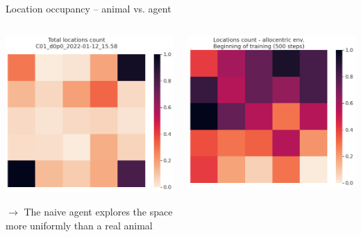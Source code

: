 \documentclass[bigger]{beamer}
\begin{document}
\begin{frame}[label={sec:org25af807}]{Location occupancy -- animal vs. agent}
\begin{columns}
\begin{column}{0.5\columnwidth}
\begin{center}
\includegraphics[height=0.43\textheight]{img/C01_d0p0_2022-01-12_15.58_locations_count.png}
\end{center}
\(\to\) The naive agent explores the space more uniformly than a real animal
\end{column}
\begin{column}{0.5\columnwidth}
\begin{center}
\includegraphics[height=0.4\textheight]{img/q-learning_allo_locations_count_500steps_all_cues.png}

\end{center}
\end{column}
\end{columns}
\end{frame}
\end{document}
